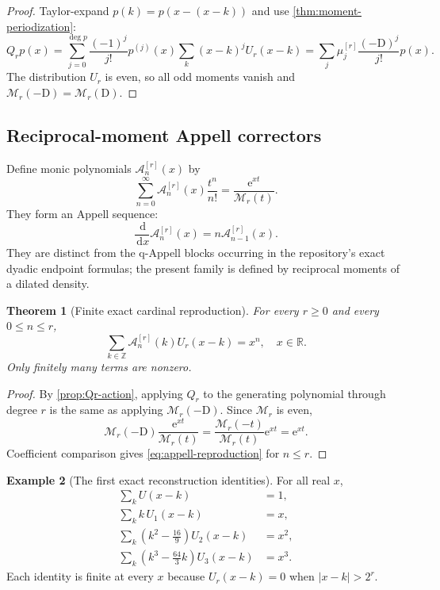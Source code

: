\documentclass[11pt,oneside]{article}
\newtheorem{theorem}{Theorem}[section]
\theoremstyle{definition}
\newtheorem{example}[theorem]{Example}
\theoremstyle{remark}
\newcommand{\R}{\mathbb R}
\newcommand{\Z}{\mathbb Z}
\newcommand{\e}{\mathrm e}
\newcommand{\dd}{\,\mathrm d}
\newcommand{\D}{\mathrm D}
\newcommand{\Acard}{\mathcal A}
\newcommand{\M}{\mathcal M}
\begin{document}
\begin{proof}
Taylor-expand $p(k)=p(x-(x-k))$ and use \cref{thm:moment-periodization}:
\[
 Q_rp(x)=\sum_{j=0}^{\deg p}\frac{(-1)^j}{j!}p^{(j)}(x)
 \sum_k(x-k)^jU_r(x-k)
 =\sum_j\mu_j^{[r]}\frac{(-\D)^j}{j!}p(x).
\]
The distribution $U_r$ is even, so all odd moments vanish and $\M_r(-\D)=\M_r(\D)$.
\end{proof}

\subsection{Reciprocal-moment Appell correctors}
Define monic polynomials $\Acard_n^{[r]}(x)$ by
\begin{equation}
 \sum_{n=0}^{\infty}\Acard_n^{[r]}(x)\frac{t^n}{n!}
 =\frac{\e^{xt}}{\M_r(t)}.
 \label{eq:appell-generating}
\end{equation}
They form an Appell sequence:
\begin{equation}
 \frac{\dd}{\dd x}\Acard_n^{[r]}(x)=n\Acard_{n-1}^{[r]}(x).
 \label{eq:appell-derivative}
\end{equation}
They are distinct from the q-Appell blocks occurring in the repository's exact dyadic endpoint formulas; the present family is defined by reciprocal moments of a dilated density.

\begin{theorem}[Finite exact cardinal reproduction]
\label{thm:appell-reproduction}
For every $r\ge0$ and every $0\le n\le r$,
\begin{equation}
 \boxed{\quad
 \sum_{k\in\Z}\Acard_n^{[r]}(k)U_r(x-k)=x^n,
 \quad x\in\R.
 \quad}
 \label{eq:appell-reproduction}
\end{equation}
Only finitely many terms are nonzero.
\end{theorem}

\begin{proof}
By \cref{prop:Qr-action}, applying $Q_r$ to the generating polynomial through degree $r$ is the same as applying $\M_r(-\D)$.  Since $\M_r$ is even,
\[
 \M_r(-\D)\frac{\e^{xt}}{\M_r(t)}
 =\frac{\M_r(-t)}{\M_r(t)}\e^{xt}=\e^{xt}.
\]
Coefficient comparison gives \eqref{eq:appell-reproduction} for $n\le r$.
\end{proof}

\begin{example}[The first exact reconstruction identities]
For all real $x$,
\begin{align}
 \sum_kU(x-k)&=1,\\
 \sum_kk\,U_1(x-k)&=x,\\
 \sum_k\left(k^2-\frac{16}{9}\right)U_2(x-k)&=x^2,\\
 \sum_k\left(k^3-\frac{64}{3}k\right)U_3(x-k)&=x^3.
 \label{eq:first-reproductions}
\end{align}
Each identity is finite at every $x$ because $U_r(x-k)=0$ when $|x-k|>2^r$.
\end{example}
\end{document}
